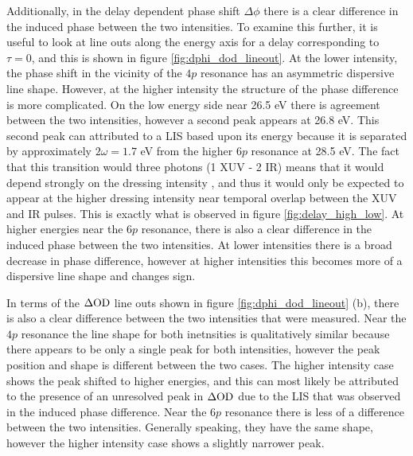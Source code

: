 Additionally, in the delay dependent phase shift $\Delta\phi$ there is a clear difference in the induced phase between the two intensities.  To examine this further, it is useful to look at line outs along the energy axis for a delay corresponding to $\tau=0$, and this is shown in figure \ref{fig:dphi_dod_lineout}.  At the lower intensity, the phase shift in the vicinity of the $4p$ resonance has an asymmetric dispersive line shape.  However, at the higher intensity the structure of the phase difference is more complicated.  On the low energy side near 26.5 eV there is agreement between the two intensities, however a second peak appears at 26.8 eV.  This second peak can attributed to a LIS based upon its energy because it is separated by approximately $2\omega=1.7$  eV from the higher $6p$ resonance at 28.5 eV.  The fact that this transition would three photons (1 XUV - 2 IR) means that it would depend strongly on the dressing intensity \cite{shankarPrinciplesQuantumMechanics2013}, and thus it would only be expected to appear at the higher dressing intensity near temporal overlap between the XUV and IR pulses.  This is exactly what is observed in figure \ref{fig:delay_high_low}. At higher energies near the $6p$ resonance, there is also a clear difference in the induced phase between the two intensities.  At lower intensities there is a broad decrease in phase difference, however at higher intensities this becomes more of a dispersive line shape and changes sign.

In terms of the $\Delta\mathrm{OD}$ line outs shown in figure \ref{fig:dphi_dod_lineout} (b), there is also a clear difference between the two intensities that were measured.  Near the $4p$ resonance the line shape for both inetnsities is qualitatively similar because there appears to be only a single peak for both intensities, however the peak position and shape is different between the two cases.  The higher intensity case shows the peak shifted to higher energies, and this can most likely be attributed to the presence of an unresolved peak in $\Delta\mathrm{OD}$ due to the LIS that was observed in the induced phase difference.  Near the $6p$ resonance there is less of a difference between the two intensities.  Generally speaking, they have the same shape, however the higher intensity case shows a slightly narrower peak.


